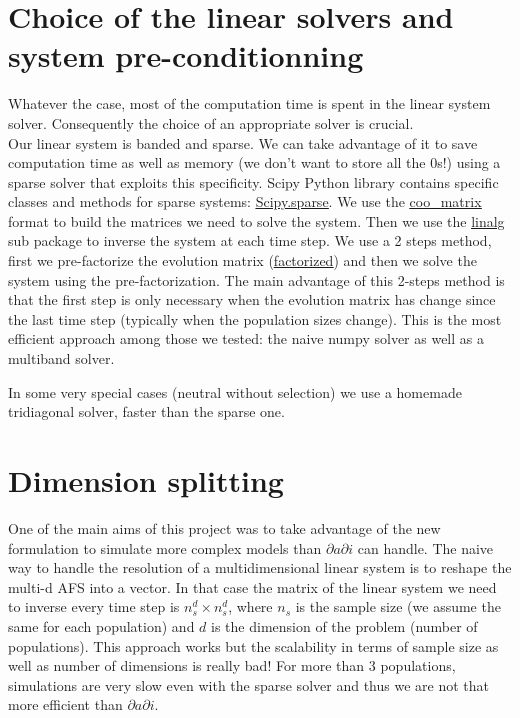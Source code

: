 \documentclass[11pt,a4paper]{article}
\begin{document}
\section{Choice of the linear solvers and system pre-conditionning}
Whatever the case, most of the computation time is spent in the linear system solver. Consequently the choice of an appropriate solver is crucial. \\
Our linear system is banded and sparse. We can take advantage of it to save computation time as well as memory (we don't want to store all the 0s!) using a sparse solver that exploits this specificity. Scipy Python library contains specific classes and methods for sparse systems: \href{http://docs.scipy.org/doc/scipy/reference/sparse.html}{\color{blue}\underline{Scipy.sparse}}. We use the \href{http://docs.scipy.org/doc/scipy/reference/generated/scipy.sparse.coo_matrix.html#scipy.sparse.coo_matrix}{\color{blue}\underline{coo\_matrix}} format to build the matrices we need to solve the system. Then we use the \href{http://docs.scipy.org/doc/scipy/reference/sparse.linalg.html#module-scipy.sparse.linalg}{\color{blue}\underline{linalg}} sub package to inverse the system at each time step. We use a 2 steps method, first we pre-factorize the evolution matrix (\href{http://docs.scipy.org/doc/scipy/reference/generated/scipy.sparse.linalg.factorized.html#scipy.sparse.linalg.factorized}{\color{blue}\underline{factorized}}) and then we solve the system using the pre-factorization.
The main advantage of this 2-steps method is that the first step is only necessary when the evolution matrix has change since the last time step (typically when the population sizes change). 
This is the most efficient approach among those we tested: the naive numpy solver as well as a multiband solver. 

In some very special cases (neutral without selection) we use a homemade tridiagonal solver, faster than the sparse one.

\section{Dimension splitting}
	One of the main aims of this project was to take advantage of the new formulation to simulate more complex models than $\partial a \partial i$ can handle. The naive way to handle the resolution of a multidimensional linear system is to reshape the multi-d AFS into a vector. In that case the matrix of the linear system we need to inverse every time step is $n_s^d \times n_s^d$, where $n_s$ is the sample size (we assume the same for each population) and $d$ is the dimension of the problem (number of populations). This approach works but the scalability in terms of sample size as well as number of dimensions is really bad! For more than 3 populations, simulations are very slow even with the sparse solver and thus we are not that more efficient than $\partial a \partial i$.\\
	
\end{document}

